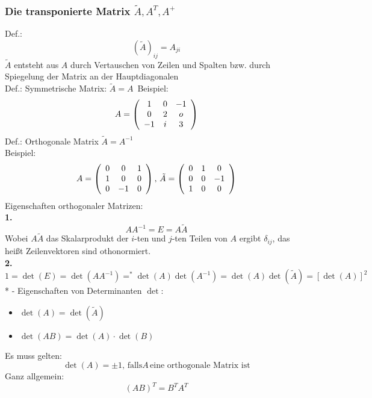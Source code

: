 \documentclass{article}
\begin{document}
\subsubsection{Die transponierte Matrix $\tilde{A}, A^T, A^+$}
Def.:
\begin{equation*}
    (\tilde{A})_{ij} = A_{ji}
\end{equation*}
$\tilde{A}$ entsteht aus $A$ durch Vertauschen von Zeilen und Spalten bzw. durch Spiegelung der Matrix an der Hauptdiagonalen\\
Def.: Symmetrische Matrix: $\tilde{A} = A$\
Beispiel:
\begin{equation*}
    A = \left(\begin{array}{c c c}
        1 & 0 & -1\\ 0 & 2 & o\\ -1 & i & 3
    \end{array}\right)
\end{equation*}
Def.: Orthogonale Matrix $\tilde{A} = A^{-1}$\\
Beispiel:
\begin{equation*}
    A = \left(\begin{array}{c c c}
        0&0&1\\1&0&0\\0&-1&0
    \end{array}\right)
    ,\, \tilde{A} = \left(\begin{array}{c c c}
        0&1&0\\0&0&-1\\1&0&0
    \end{array}\right)
\end{equation*}
Eigenschaften orthogonaler Matrizen:\\
\textbf{1.}
\begin{equation*}
    AA^{-1} = E = A\tilde{A}
\end{equation*}
Wobei $A\tilde{A}$ das Skalarprodukt der $i$-ten und $j$-ten Teilen von $A$ ergibt $\delta_{ij}$, das heißt Zeilenvektoren sind othonormiert.\\
\textbf{2.}
\begin{equation*}
    1 = \det(E) = \det(AA^{-1}) =^*\det(A)\det(A^{-1}) = \det(A) \det(\tilde{A}) = \left[\det(A)\right]^2
\end{equation*}
* - Eigenschaften von Determinanten $\det$:
\begin{itemize}
    \item $\det(A) = \det(\tilde{A})$
    \item $\det(AB) = \det(A)\cdot\det(B)$
\end{itemize}
Es muss gelten:\\
\begin{equation*}
    \det(A) = \pm 1,\, \text{falls} A\, \text{eine orthogonale Matrix ist}
\end{equation*}
Ganz allgemein:
\begin{equation*}
    (AB)^T = B^TA^T
\end{equation*}
\end{document}
